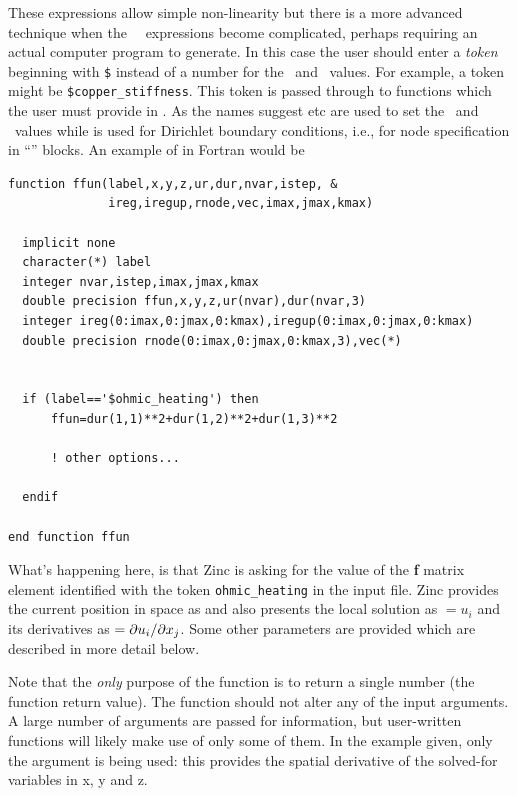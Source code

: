 \documentclass[a4paper,twoside,11pt]{book}
\begin{document}
These expressions allow simple non-linearity but there is a more
advanced technique when the \caf\, \qg\ expressions become
complicated, perhaps requiring an actual computer program to
generate. In this case the user should enter a \emph{token} beginning
with \verb+$+ instead of a number for the \caf\ and \qg\ values. For
example, a token might be \verb+$copper_stiffness+. This token is
passed through to functions 
which the user must provide in . As the names suggest
 etc are used to set the \caf\ and \qg\ values while
 is used for Dirichlet boundary conditions, i.e., for node
specification in ``'' blocks.  An example of
 in Fortran would be
\begin{verbatim}
function ffun(label,x,y,z,ur,dur,nvar,istep, &
              ireg,iregup,rnode,vec,imax,jmax,kmax)

  implicit none
  character(*) label
  integer nvar,istep,imax,jmax,kmax
  double precision ffun,x,y,z,ur(nvar),dur(nvar,3)
  integer ireg(0:imax,0:jmax,0:kmax),iregup(0:imax,0:jmax,0:kmax)
  double precision rnode(0:imax,0:jmax,0:kmax,3),vec(*)


  if (label=='$ohmic_heating') then
      ffun=dur(1,1)**2+dur(1,2)**2+dur(1,3)**2

      ! other options...

  endif
  
end function ffun
\end{verbatim}
What's happening here, is that Zinc is asking for the value of the
\textbf{f} matrix element identified with the token
\verb+ohmic_heating+ in the  input file. Zinc provides
the current position in space as  and also presents the
local solution as $=u_i$ and its derivatives as
$=\partial u_i/\partial x_j$. Some other parameters are provided
which are described in more detail below.

Note that the \emph{only} purpose of the function is to return a
single number (the function return value). The function should not
alter any of the input arguments. A large number of arguments are
passed for information, but user-written functions will likely make
use of only some of them. In the example given, only the argument
 is being used: this provides the spatial derivative of the
solved-for variables in x, y and z.
\end{document}
